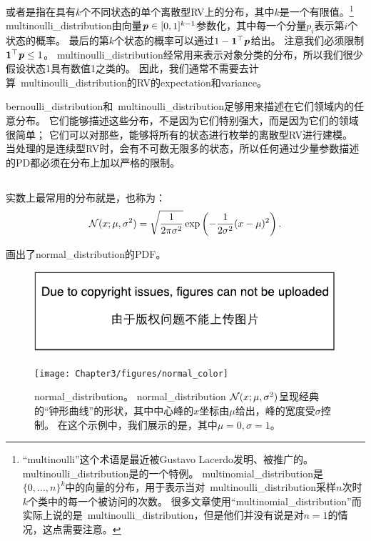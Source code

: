 或者是指在具有$k$个不同状态的单个离散型\gls{RV}上的分布，其中$k$是一个有限值。\footnote{``multinoulli''这个术语是最近被Gustavo Lacerdo发明、被\cite{MurphyBook2012}推广的。
\gls{multinoulli_distribution}是的一个特例。
\gls{multinomial_distribution}是$\{0,\ldots, n\}^k$中的向量的分布，用于表示当对~\gls{multinoulli_distribution}采样$n$次时$k$个类中的每一个被访问的次数。
很多文章使用``\gls{multinomial_distribution}''而实际上说的是~\gls{multinoulli_distribution}，但是他们并没有说是对$n=1$的情况，这点需要注意。}
\gls{multinoulli_distribution}由向量$\boldsymbol{\mathit{p}} \in [0, 1]^{k-1}$参数化，其中每一个分量$p_i$表示第$i$个状态的概率。
最后的第$k$个状态的概率可以通过$1-\boldsymbol{1}^\top \boldsymbol{\mathit{p}}$给出。
注意我们必须限制$\boldsymbol{1}^\top \boldsymbol{\mathit{p}} \le 1$。
\gls{multinoulli_distribution}经常用来表示对象分类的分布，所以我们很少假设状态1具有数值1之类的。
因此，我们通常不需要去计算~\gls{multinoulli_distribution}的\gls{RV}的\gls{expectation}和\gls{variance}。


\gls{bernoulli_distribution}和~\gls{multinoulli_distribution}足够用来描述在它们领域内的任意分布。
它们能够描述这些分布，不是因为它们特别强大，而是因为它们的领域很简单；
它们可以对那些，能够将所有的状态进行枚举的离散型\gls{RV}进行建模。
当处理的是连续型\gls{RV}时，会有不可数无限多的状态，所以任何通过少量参数描述的\gls{PD}都必须在分布上加以严格的限制。

\subsection{}
\label{sec:gaussian_distribution}


实数上最常用的分布就是，也称为：
\begin{equation}
\mathcal{N}(x; \mu, \sigma^2) = \sqrt{\frac{1}{2\pi \sigma^2}} \exp \left ( -\frac{1}{2\sigma^2} (x-\mu)^2 \right ).
\end{equation}

画出了\gls{normal_distribution}的\gls{PDF}。
\begin{figure}[!htb]
\ifOpenSource
\centerline{\includegraphics{figure.pdf}}
\else
\centerline{\texttt{[image: Chapter3/figures/normal\_color]}}
\fi
\captionsetup{singlelinecheck=off}
\caption[.]{\gls{normal_distribution}。
\gls{normal_distribution} $\mathcal{N}(x; \mu, \sigma^2)$呈现经典的``钟形曲线''的形状，其中中心峰的$x$坐标由$\mu$给出，峰的宽度受$\sigma$控制。
在这个示例中，我们展示的是，其中$\mu=0, \sigma = 1$。}
\label{fig:chap3_normal_color}
\end{figure}

